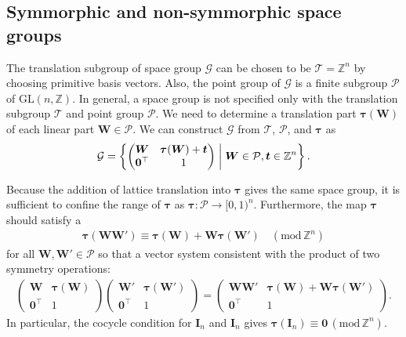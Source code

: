 \subsection{\label{sec:vector_system}Symmorphic and non-symmorphic space groups}

The translation subgroup of space group $\mathcal{G}$ can be chosen to be $\mathcal{T} = \mathbb{Z}^{n}$ by choosing primitive basis vectors.
Also, the point group of $\mathcal{G}$ is a finite subgroup $\mathcal{P}$ of $\mathrm{GL}(n, \mathbb{Z})$.
In general, a space group is not specified only with the translation subgroup $\mathcal{T}$ and point group $\mathcal{P}$.
We need to determine a translation part $\bm{\tau}(\bm{W})$ of each linear part $\bm{W} \in \mathcal{P}$.
We can construct $\mathcal{G}$ from $\mathcal{T}$, $\mathcal{{P}}$, and $\bm{\tau}$ as
\begin{align}
  \mathcal{G} = \left\{ 
    \begin{pmatrix}
      \bm{W} & \bm{\tau}(\bm{W}) + \bm{t} \\
      \bm{0}^{\top} & 1 \\
    \end{pmatrix}
   \mathrel{}\middle|\mathrel{} 
    \bm{W} \in \mathcal{P}, \bm{t} \in \mathbb{Z}^{n}
   \right\}.
\end{align}

Because the addition of lattice translation into $\bm{\tau}$ gives the same space group, it is sufficient to confine the range of $\bm{\tau}$ as $\bm{\tau}: \mathcal{P} \to [0, 1)^{n}$.
Furthermore, the map $\bm{\tau}$ should satisfy a 
\begin{align}
  \label{eq:cocycle_condition}
  \bm{\tau}(\bm{W}\bm{W}') \equiv \bm{\tau}(\bm{W}) + \bm{W} \bm{\tau}(\bm{W}') \quad ( \mathrm{mod} \, \mathbb{Z}^{n})
\end{align}
for all $\bm{W}, \bm{W}' \in \mathcal{P}$ so that a vector system consistent with the product of two symmetry operations:
\begin{align*}
  \begin{pmatrix}
    \bm{W} & \bm{\tau}(\bm{W}) \\
    \bm{0}^{\top} & 1
  \end{pmatrix}
  \begin{pmatrix}
    \bm{W}' & \bm{\tau}(\bm{W}') \\
    \bm{0}^{\top} & 1
  \end{pmatrix}
  =
  \begin{pmatrix}
    \bm{W}\bm{W}' & \bm{\tau}(\bm{W}) + \bm{W} \bm{\tau}(\bm{W}') \\
    \bm{0}^{\top} & 1
  \end{pmatrix}.
\end{align*}
In particular, the cocycle condition for $\bm{I}_{n}$ and $\bm{I}_{n}$ gives $\bm{\tau}(\bm{I}_{n}) \equiv \bm{0} \, (\mathrm{mod}\, \mathbb{Z}^{n})$.

